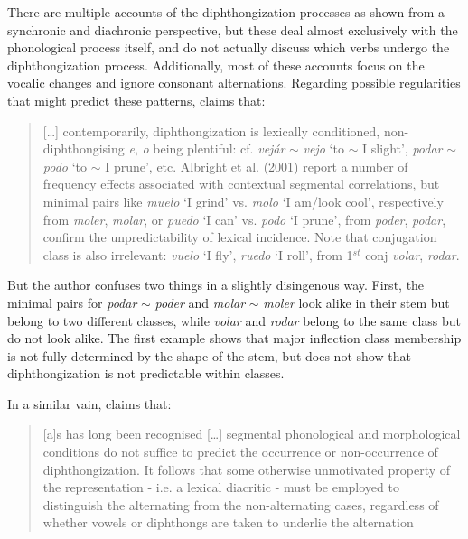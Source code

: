 There are multiple accounts of the diphthongization processes as shown  from a synchronic \autocites{Bellido.1986, Carreira.1991, Harris.1985, Kikuchi.1997} and diachronic \autocite{Wilkinson.1971} perspective, but these deal almost exclusively with the phonological process itself, and do not actually discuss which verbs undergo the diphthongization process. Additionally, most of these accounts focus on the vocalic changes and ignore consonant alternations. Regarding possible regularities that might predict these patterns, \textcite[423]{Roca.2010} claims that:

\begin{quotation}
[\dots] contemporarily, diphthongization is lexically conditioned, non-diphthong\-i\-s\-ing \textit{e}, \textit{o} being plentiful: cf. \textit{vejár} $\sim$ \textit{vejo} `to $\sim$ I slight', \textit{podar} $\sim$ \textit{podo} `to $\sim$ I prune', etc. Albright et al. (2001) report a number of frequency effects associated with contextual segmental correlations, but minimal pairs like \textit{muelo} `I grind' vs. \textit{molo} `I am/look cool', respectively from \textit{moler}, \textit{molar}, or \textit{puedo} `I can' vs. \textit{podo} `I prune', from \textit{poder}, \textit{podar}, confirm the unpredictability of lexical incidence. Note that conjugation class is also irrelevant: \textit{vuelo} `I fly', \textit{ruedo} `I roll', from 1$^{st}$ conj \textit{volar}, \textit{rodar}.
\end{quotation}

But the author confuses two things in a slightly disingenous way. First, the minimal pairs for \textit{podar} $\sim$ \textit{poder} and \textit{molar} $\sim$ \textit{moler} look alike in their stem but belong to two different classes, while \textit{volar} and \textit{rodar} belong to the same class but do not look alike. The first example shows that major inflection class membership is not fully determined by the shape of the stem, but does not show that diphthongization is not predictable within classes.

In a similar vain, \textcite[32]{Harris.1985} claims that:

\begin{quotation}
[a]s has long been recognised [\dots] segmental phonological  and morphological conditions do not suffice to predict the occurrence or non-occurrence of diphthongization. It follows that some otherwise unmotivated property of the representation - i.e. a lexical diacritic - must be employed to distinguish the alternating from the non-alternating cases, regardless of whether vowels or diphthongs are taken to underlie the alternation
\end{quotation}

